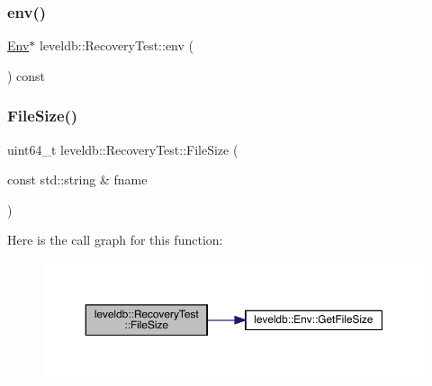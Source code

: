 \subsubsection{\texorpdfstring{env()}{env()}}
{\footnotesize\ttfamily \mbox{\hyperlink{classleveldb_1_1_env}{Env}}$\ast$ leveldb\+::\+Recovery\+Test\+::env (\begin{DoxyParamCaption}{ }\end{DoxyParamCaption}) const\hspace{0.3cm}{\ttfamily [inline]}}

\mbox{\label{classleveldb_1_1_recovery_test_a0e1b5ec063241e273e4c38f7c70a988c}} 
\subsubsection{\texorpdfstring{FileSize()}{FileSize()}}
{\footnotesize\ttfamily uint64\+\_\+t leveldb\+::\+Recovery\+Test\+::\+File\+Size (\begin{DoxyParamCaption}\item[{const std\+::string \&}]{fname }\end{DoxyParamCaption})\hspace{0.3cm}{\ttfamily [inline]}}

Here is the call graph for this function\+:
\nopagebreak
\begin{figure}[H]
\begin{center}
\leavevmode
\includegraphics[width=350pt]{classleveldb_1_1_recovery_test_a0e1b5ec063241e273e4c38f7c70a988c_cgraph}
\end{center}
\end{figure}
\mbox{\label{classleveldb_1_1_recovery_test_acc405124d7e1408642f64dadf0eb9227}} 
